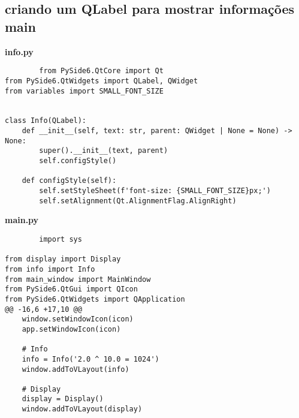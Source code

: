 \documentclass[12pt,a4paper]{article}
\begin{document}
    \subsection{criando um QLabel para mostrar informações
    main}
    \textbf{info.py}
    \begin{lstlisting}
        from PySide6.QtCore import Qt
from PySide6.QtWidgets import QLabel, QWidget
from variables import SMALL_FONT_SIZE


class Info(QLabel):
    def __init__(self, text: str, parent: QWidget | None = None) -> None:
        super().__init__(text, parent)
        self.configStyle()

    def configStyle(self):
        self.setStyleSheet(f'font-size: {SMALL_FONT_SIZE}px;')
        self.setAlignment(Qt.AlignmentFlag.AlignRight)
    \end{lstlisting}
    \textbf{main.py}
    \begin{lstlisting}
        import sys

from display import Display
from info import Info
from main_window import MainWindow
from PySide6.QtGui import QIcon
from PySide6.QtWidgets import QApplication
@@ -16,6 +17,10 @@
    window.setWindowIcon(icon)
    app.setWindowIcon(icon)

    # Info
    info = Info('2.0 ^ 10.0 = 1024')
    window.addToVLayout(info)

    # Display
    display = Display()
    window.addToVLayout(display)
    \end{lstlisting}
\end{document}
